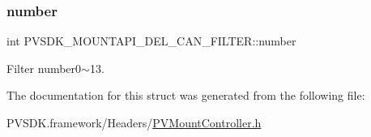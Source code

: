 \subsubsection{\texorpdfstring{number}{number}}
{\footnotesize\ttfamily int P\+V\+S\+D\+K\+\_\+\+M\+O\+U\+N\+T\+A\+P\+I\+\_\+\+D\+E\+L\+\_\+\+C\+A\+N\+\_\+\+F\+I\+L\+T\+E\+R\+::number}



Filter number0$\sim$13. 



The documentation for this struct was generated from the following file\+:\begin{DoxyCompactItemize}
\item 
P\+V\+S\+D\+K.\+framework/\+Headers/\hyperlink{_p_v_mount_controller_8h}{P\+V\+Mount\+Controller.\+h}\end{DoxyCompactItemize}

